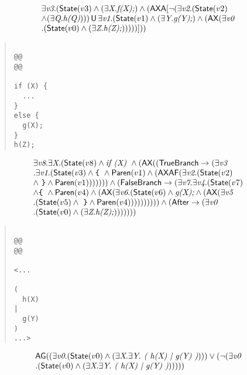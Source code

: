 \documentclass{article}
\newcommand{\U}{\,\mbox{\sf{U}}\,}
\newcommand{\A}{\mbox{\sf{A}}}
\newcommand{\AX}{\mbox{\sf{AX}}}
\newcommand{\AF}{\mbox{\sf{AF}}}
\newcommand{\AG}{\mbox{\sf{AG}}}
\newcommand{\mita}[1]{\mbox{\it{{#1}}}}
\newcommand{\msf}[1]{\mbox{\sf{{#1}}}}
\newcommand{\ttlb}{\mbox{\tt \char'173}}
\newcommand{\ttrb}{\mbox{\tt \char'175}}
\begin{document}
\[\begin{array}{l}
\exists \mita{v3} . (\msf{State}(v3) \wedge (\exists \mita{X} . \mita{f(X);}) \wedge (\AX\A[\neg (\exists \mita{v2} . (\msf{State}(v2)\\ \wedge (\exists \mita{Q} . \mita{h(Q)}))) \U \exists \mita{v1} . (\msf{State}(v1) \wedge (\exists \mita{Y} . \mita{g(Y);}) \wedge (\AX(\exists \mita{v0}\\ . (\msf{State}(v0) \wedge (\exists \mita{Z} . \mita{h(Z);})))))]
))
\end{array}\]

\begin{quote}\begin{verbatim}

@@
@@

if (X) {
  ...
}
else {
  g(X);
}
h(Z);
\end{verbatim}\end{quote}

\[\begin{array}{l}
\exists \mita{v8} . \exists \mita{X} . (\msf{State}(v8) \wedge \mita{if (X) } \wedge (\AX((\msf{TrueBranch} \rightarrow (\exists \mita{v3}\\ . \exists \mita{v1} . (\msf{State}(v3) \wedge \mita{{\ttlb}
  } \wedge \msf{Paren}(v1) \wedge (\AX\AF(\exists \mita{v2} . (\msf{State}(v2)\\ \wedge \mita{
{\ttrb}} \wedge \msf{Paren}(v1))))))) \wedge (\msf{FalseBranch} \rightarrow (\exists \mita{v7} . \exists \mita{v4} . (\msf{State}(v7)\\ \wedge \mita{{\ttlb}
  } \wedge \msf{Paren}(v4) \wedge (\AX(\exists \mita{v6} . (\msf{State}(v6) \wedge \mita{g(X);} \wedge (\AX(\exists \mita{v5}\\ . (\msf{State}(v5) \wedge \mita{
{\ttrb}} \wedge \msf{Paren}(v4)))))))))) \wedge (\msf{After} \rightarrow (\exists \mita{v0}\\ . (\msf{State}(v0) \wedge (\exists \mita{Z} . \mita{h(Z);})))))))
\end{array}\]

\begin{quote}\begin{verbatim}

@@
@@

<...
  
(
  h(X)
|
  g(Y)
)
...>
\end{verbatim}\end{quote}

\[\begin{array}{l}
\AG((\exists \mita{v0} . (\msf{State}(v0) \wedge (\exists \mita{X} . \exists \mita{Y} . \mita{
(
h(X)
|
g(Y)
)}))) \vee (\neg (\exists \mita{v0}\\ . (\msf{State}(v0) \wedge (\exists \mita{X} . \exists \mita{Y} . \mita{
(
h(X)
|
g(Y)
)})))))
\end{array}\]
\end{document}
